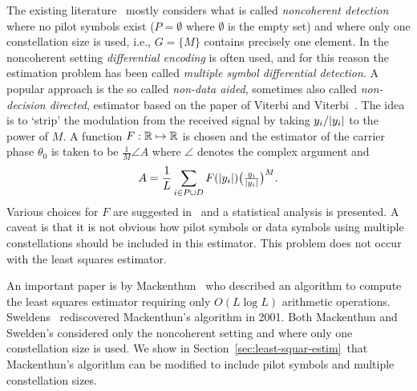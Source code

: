 \documentclass[journal]{IEEEtran}
\begin{document}
The existing literature~\cite{Mackenthun1994,Cowley_ref_sym_carr_1998,ViterbiViterbi_phase_est_1983,Sweldens2001,Wilson1989,Makrakis1990,Liu1991} mostly considers what is called \emph{noncoherent detection} where no pilot symbols exist ($P = \emptyset$ where $\emptyset$ is the empty set) and where only one constellation size is used, i.e., $G = \{M\}$ contains precisely one element.  In the noncoherent setting \emph{differential encoding} is often used, and for this reason the estimation problem has been called \emph{multiple symbol differential detection}.  A popular approach is the so called \emph{non-data aided}, sometimes also called \emph{non-decision directed}, estimator based on the paper of Viterbi and Viterbi~\cite{ViterbiViterbi_phase_est_1983}.  The idea is to `strip' the modulation from the received signal by taking $y_i / {\left\vert y_i \right\vert}$ to the power of $M$.  A function $F: {\mathbb R} \mapsto {\mathbb R}$ is chosen and the estimator of the carrier phase $\theta_0$ is taken to be $\tfrac{1}{M}\angle{A}$ where $\angle$ denotes the complex argument and
\[
A = \frac{1}{L}\sum_{i \in P \cup D} F({\left\vert y_i \right\vert}) \big(\tfrac{y_i}{{\left\vert y_i \right\vert}}\big)^M.
\]
Various choices for $F$ are suggested in~\cite{ViterbiViterbi_phase_est_1983} and a statistical analysis is presented.  A caveat is that it is not obvious how pilot symbols or data symbols using multiple constellations should be included in this estimator.  %
This problem does not occur with the least squares estimator.

An important paper is by Mackenthun~\cite{Mackenthun1994} who described an algorithm to compute the least squares estimator requiring only $O(L \log L)$ arithmetic operations.  Sweldens~\cite{Sweldens2001} rediscovered Mackenthun's algorithm in 2001.  Both Mackenthun and Swelden's considered only the noncoherent setting and where only one constellation size is used.  We show in Section~\ref{sec:least-squar-estim}~that Mackenthun's algorithm can be modified to include pilot symbols and multiple constellation sizes. %
\end{document}
